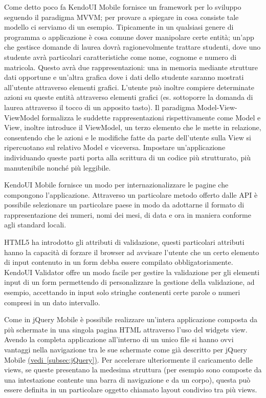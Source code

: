 			Come detto poco fa KendoUI Mobile fornisce un framework per lo
			sviluppo seguendo il paradigma MVVM; per provare a spiegare in cosa
			consiste tale modello ci serviamo di un esempio. Tipicamente in un
			qualsiasi genere di programma o applicazione è cosa comune dover
			manipolare certe entità; un'app che gestisce domande di laurea dovrà
			ragionevolmente trattare studenti, dove uno studente avrà 
			particolari caratteristiche come nome, cognome e numero di matricola.
			Questo avrà due rappresentazioni: una in memoria mediante strutture
			dati opportune e un'altra grafica dove i dati dello studente saranno
			mostrati all'utente attraverso elementi grafici. L'utente può
			inoltre compiere determinate azioni su queste entità attraverso
			elementi grafici (es. sottoporre la domanda di laurea attraverso
			il tocco di un apposito tasto). Il paradigma Mo\-del-\-View-\-View\-Mo\-del 
			formalizza le suddette rappresentazioni rispettivamente come Model e 
			View, inoltre introduce il ViewModel, un terzo elemento che le mette 
			in relazione, consentendo che le azioni e le modifiche fatte da
			parte dell'utente sulla View si ripercuotano sul relativo Model e
			viceversa. Impostare un'applicazione individuando queste parti
			porta alla scrittura di un codice più strutturato, più manutenibile
			nonché più leggibile.
			
			KendoUI Mobile fornisce un modo per internazionalizzare le pagine che 
			compongono l'applicazione. Attraverso un particolare metodo offerto
			dalle API è possibile selezionare un particolare paese in modo da
			adottarne il formato di rappresentazione dei numeri, nomi dei mesi,  
			di data e ora in maniera conforme agli standard locali.
	
			HTML5 ha introdotto gli attributi di validazione, questi particolari 
			attributi hanno la capacità di forzare il browser ad avvisare
			l'utente che un certo elemento di input contenuto in un form debba
			essere compilato obbligatoriamente.	KendoUI Validator offre un modo
			facile per gestire la validazione per gli elementi input di un form
			permettendo di personalizzare la gestione della validazione, ad
			esempio, accettando in input solo stringhe contenenti certe parole o
			numeri compresi in un dato intervallo.
			
			Come in jQuery Mobile è possibile realizzare un'intera applicazione
			composta da più schermate in una singola pagina HTML attraverso l'uso
			del widgets view. Avendo la completa applicazione all'interno di un
			unico file si hanno ovvi vantaggi nella navigazione tra le sue schermate
			come già descritto per jQuery Mobile
			\hyperref[subsec:jQuery]{(vedi~\ref{subsec:jQuery})}.
			Per accelerare ulteriormente il caricamento delle views, se queste
			presentano la medesima struttura (per esempio sono composte da una
			intestazione contente una barra di navigazione e da un corpo),
			questa può essere definita in un particolare oggetto chiamato layout
			condiviso tra più views.
			
